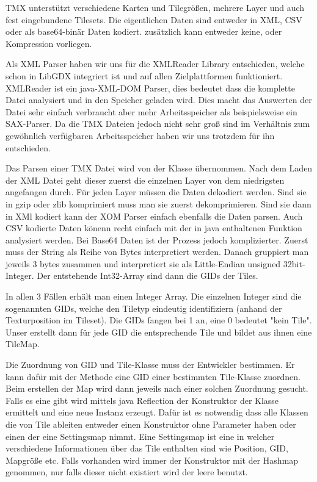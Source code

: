 TMX unterstützt verschiedene Karten und Tilegrößen, mehrere Layer und auch fest eingebundene Tilesets. Die eigentlichen Daten sind entweder in XML, CSV oder als base64-binär Daten kodiert. zusätzlich kann entweder keine,  oder  Kompression vorliegen\cite{TMXDOC}.

Als XML Parser haben wir uns für die XMLReader Library entschieden, welche schon in LibGDX integriert ist und auf allen Zielplattformen funktioniert. XMLReader ist ein java-XML-DOM Parser, dies bedeutet dass die komplette Datei analysiert und in den Speicher geladen wird. Dies macht das Auswerten der Datei sehr einfach verbraucht aber mehr Arbeitsspeicher als beispielsweise ein SAX-Parser. Da die TMX Dateien jedoch nicht sehr groß sind im Verhältnis zum gewöhnlich verfügbaren Arbeitsspeicher haben wir uns trotzdem für ihn entschieden.

Das Parsen einer TMX Datei wird von der Klasse  übernommen. Nach dem Laden der XML Datei geht dieser zuerst die einzelnen Layer von dem niedrigsten angefangen durch. Für jeden Layer müssen die Daten dekodiert werden. Sind sie in gzip oder zlib komprimiert muss man sie zuerst dekomprimieren. Sind sie dann in XMl kodiert kann der XOM Parser einfach ebenfalls die Daten parsen. Auch CSV kodierte Daten könenn recht einfach mit der in java enthaltenen  Funktion analysiert werden.
Bei Base64 Daten ist der Prozess jedoch komplizierter. Zuerst muss der String als Reihe von Bytes interpretiert werden. Danach gruppiert man jeweils 3 bytes zusammen und interpretiert sie als Little-Endian unsigned 32bit-Integer. Der entstehende Int32-Array sind dann die GIDs der Tiles.

In allen 3 Fällen erhält man einen Integer Array. Die einzelnen Integer sind die sogenannten GIDs, welche den Tiletyp eindeutig identifiziern (anhand der Texturposition im Tileset).
Die GIDs fangen bei 1 an, eine 0 bedeutet "kein Tile". Unser  erstellt dann für jede GID die entsprechende Tile und bildet aus ihnen eine TileMap.

Die Zuordnung von GID und Tile-Klasse muss der Entwickler bestimmen. Er kann dafür mit der Methode  eine GID einer bestimmten Tile-Klasse zuordnen. Beim erstellen der Map wird dann jeweils nach einer solchen Zuordnung gesucht. Falls es eine gibt wird mittels java Reflection der Konstruktor der Klasse ermittelt und eine neue Instanz erzeugt. Dafür ist es notwendig dass alle Klassen die von Tile ableiten entweder einen Konstruktor ohne Parameter haben oder einen der eine Settingsmap nimmt. Eine Settingsmap ist eine  in welcher verschiedene Informationen über das Tile enthalten sind wie Position, GID, Mapgröße etc. Falls vorhanden wird immer der Konstruktor mit der Hashmap genommen, nur falls dieser nicht existiert wird der leere benutzt.

